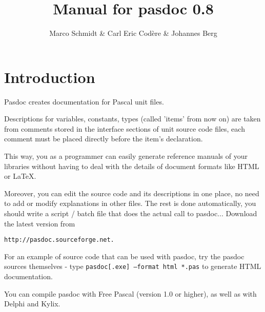 \documentclass[11pt]{article}
\begin{document}
\title{Manual for pasdoc 0.8}
\author{Marco Schmidt \& Carl Eric Cod\`{e}re \& Johannes Berg}

\maketitle

\newpage

\tableofcontents

\newpage

\section{Introduction}

Pasdoc creates documentation for Pascal unit files.

Descriptions for variables, constants, types (called 'items' from now on) are 
taken from comments stored in the interface sections of unit source code files,
each comment must be placed directly before the item's declaration.

This way, you as a programmer can easily generate reference manuals of your
libraries without having to deal with the details of document formats like
HTML or \LaTeX.

Moreover, you can edit the source code and its descriptions in one
place, no need to add or modify explanations in other files.
The rest is done automatically, you should write a script / batch file that
does the actual call to pasdoc...
Download the latest version from
\begin{verbatim}
http://pasdoc.sourceforge.net.
\end{verbatim}
For an example of source code that can be used with pasdoc, try the pasdoc
sources themselves - type {\tt pasdoc[.exe] --format html *.pas} to generate HTML
documentation.

You can compile pasdoc with Free Pascal (version 1.0 or higher), as well
as with Delphi and Kylix. 
\end{document}
